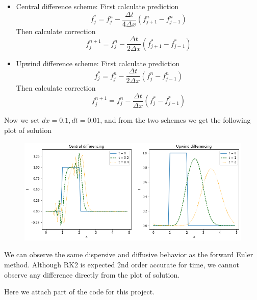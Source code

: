\documentclass{article}
\begin{document}
\begin{itemize}
\item Central difference scheme:
First calculate prediction
$$f_j^*=f_j^n-\frac{\Delta t}{4\Delta x}(f_{j+1}^n-f_{j-1}^n)$$
Then calculate correction
$$f_j^{n+1}=f_j^n-\frac{\Delta t}{2\Delta x}(f_{j+1}^*-f_{j-1}^*)$$
\item Upwind difference scheme:
First calculate prediction
$$f_j^*=f_j^n-\frac{\Delta t}{2\Delta x}(f_{j}^n-f_{j-1}^n)$$
Then calculate correction
$$f_j^{n+1}=f_j^n-\frac{\Delta t}{\Delta x}(f_{j}^*-f_{j-1}^*)$$
\end{itemize}
Now we set $dx=0.1, dt=0.01$, and from the two schemes we get the following plot of solution
\begin{figure}[H]
    \centering
    \includegraphics[width = 15cm]{pictures/pic7.png}
\end{figure}
We can observe the same dispersive and diffusive behavior as the forward Euler method. Although RK2 is expected 2nd order accurate for time, we cannot observe any difference directly from the plot of solution.




\newpage
\appendix
Here we attach part of the code for this project.
\end{document}

